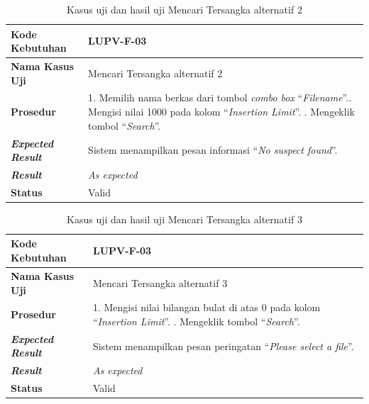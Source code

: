 \par\null\par
\begin{longtable}{|L{3cm}|L{9cm}|}
  \caption{Kasus uji dan hasil uji Mencari Tersangka alternatif 2}\label{tab:search-suspect-2} \\
  \hline
  \textbf{Kode Kebutuhan} & LUPV-F-03 \\\hline
  \textbf{Nama Kasus Uji} & Mencari Tersangka alternatif 2\\\hline
  \textbf{Prosedur} & 1. Memilih nama berkas dari tombol \emph{combo box}
                      ``\emph{Filename}''.. Mengisi nilai 1000 pada kolom ``\emph{Insertion
                      Limit}''. . Mengeklik tombol ``\emph{Search}''.\\\hline
  \textbf{\emph{Expected Result}} & Sistem menampilkan pesan informasi
                                    ``\emph{No suspect found}''.\\\hline
  \textbf{\emph{Result}} & \emph{As expected} \\\hline
  \textbf{Status} & Valid\\\hline
\end{longtable}

\begin{longtable}{|L{3cm}|L{9cm}|}
  \caption{Kasus uji dan hasil uji Mencari Tersangka alternatif 3}\label{tab:search-suspect-3} \\
  \hline
  \textbf{Kode Kebutuhan} & LUPV-F-03 \\\hline
  \textbf{Nama Kasus Uji} & Mencari Tersangka alternatif 3\\\hline
  \textbf{Prosedur} & 1. Mengisi nilai bilangan bulat di atas 0 pada kolom ``\emph{Insertion
                      Limit}''. . Mengeklik tombol ``\emph{Search}''.\\\hline
  \textbf{\emph{Expected Result}} & Sistem menampilkan pesan peringatan ``\emph{Please select a file}''.\\\hline
  \textbf{\emph{Result}} & \emph{As expected} \\\hline
  \textbf{Status} & Valid\\\hline
\end{longtable}

